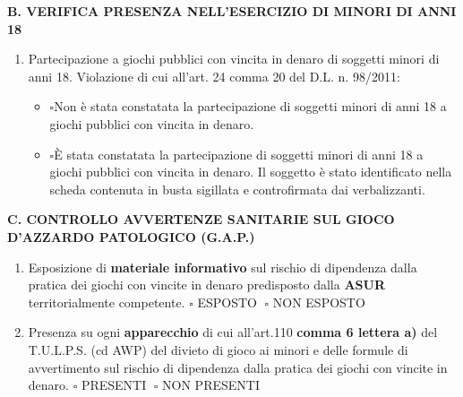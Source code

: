 \documentclass[12pt]{article}
\begin{document}
\begin{center}
    \textbf{B. VERIFICA PRESENZA NELL’ESERCIZIO DI MINORI DI ANNI 18}
\end{center}

\begin{enumerate}[resume]
    \item Partecipazione a giochi pubblici con vincita in denaro di soggetti minori di anni 18. Violazione di cui all’art. 24 comma 20 del D.L. n. 98/2011:
    \begin{itemize}[label={}]
        \item \begin{math}\square\end{math}Non è stata constatata la partecipazione di soggetti minori di anni 18 a giochi pubblici con vincita in denaro.
        \item \begin{math}\square\end{math}È stata constatata la partecipazione di soggetti minori di anni 18 a giochi pubblici con vincita in denaro. Il soggetto è stato  identificato nella scheda contenuta in busta sigillata e controfirmata dai verbalizzanti.
    \end{itemize}
\end{enumerate}


\begin{center}
    \textbf{C. CONTROLLO AVVERTENZE SANITARIE SUL GIOCO D’AZZARDO PATOLOGICO (G.A.P.)}
\end{center}
\begin{enumerate}[resume]
    \item Esposizione di \textbf{materiale informativo} sul rischio di dipendenza dalla pratica dei giochi con vincite in denaro predisposto dalla \textbf{ASUR} territorialmente competente.
    \begin{math} \square\end{math} ESPOSTO \begin{math}\;\square\end{math} NON ESPOSTO
    \item Presenza su ogni \textbf{apparecchio} di cui all’art.110 \textbf{comma 6 lettera a)} del T.U.L.P.S. (cd AWP) del divieto di gioco ai minori e delle formule di avvertimento sul rischio di dipendenza dalla pratica dei giochi con vincite in denaro.
    \begin{math} \square\end{math} PRESENTI \begin{math}\;\square\end{math} NON PRESENTI
\end{enumerate}
\end{document}
